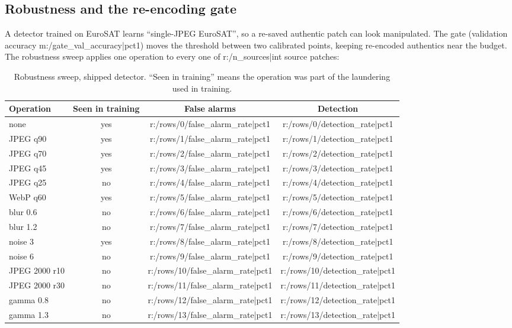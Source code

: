 \subsection{Robustness and the re-encoding gate}\label{sec:robust}
A detector trained on EuroSAT learns ``single-JPEG EuroSAT'', so a re-saved authentic patch can look manipulated. The gate (validation accuracy {{m:/gate_val_accuracy|pct1}}) moves the threshold between two calibrated points, keeping re-encoded authentics near the budget. The robustness sweep applies one operation to every one of {{r:/n_sources|int}} source patches:

\begin{table}[!htbp]
\centering\small
\begin{tabular}{|l|c|c|c|}
\hline
\textbf{Operation} & \textbf{Seen in training} & \textbf{False alarms} & \textbf{Detection}\\
\hline
none & yes & {{r:/rows/0/false_alarm_rate|pct1}} & {{r:/rows/0/detection_rate|pct1}}\\
\hline
JPEG q90 & yes & {{r:/rows/1/false_alarm_rate|pct1}} & {{r:/rows/1/detection_rate|pct1}}\\
\hline
JPEG q70 & yes & {{r:/rows/2/false_alarm_rate|pct1}} & {{r:/rows/2/detection_rate|pct1}}\\
\hline
JPEG q45 & yes & {{r:/rows/3/false_alarm_rate|pct1}} & {{r:/rows/3/detection_rate|pct1}}\\
\hline
JPEG q25 & no & {{r:/rows/4/false_alarm_rate|pct1}} & {{r:/rows/4/detection_rate|pct1}}\\
\hline
WebP q60 & yes & {{r:/rows/5/false_alarm_rate|pct1}} & {{r:/rows/5/detection_rate|pct1}}\\
\hline
blur 0.6 & no & {{r:/rows/6/false_alarm_rate|pct1}} & {{r:/rows/6/detection_rate|pct1}}\\
\hline
blur 1.2 & no & {{r:/rows/7/false_alarm_rate|pct1}} & {{r:/rows/7/detection_rate|pct1}}\\
\hline
noise 3 & yes & {{r:/rows/8/false_alarm_rate|pct1}} & {{r:/rows/8/detection_rate|pct1}}\\
\hline
noise 6 & no & {{r:/rows/9/false_alarm_rate|pct1}} & {{r:/rows/9/detection_rate|pct1}}\\
\hline
JPEG 2000 r10 & no & {{r:/rows/10/false_alarm_rate|pct1}} & {{r:/rows/10/detection_rate|pct1}}\\
\hline
JPEG 2000 r30 & no & {{r:/rows/11/false_alarm_rate|pct1}} & {{r:/rows/11/detection_rate|pct1}}\\
\hline
gamma 0.8 & no & {{r:/rows/12/false_alarm_rate|pct1}} & {{r:/rows/12/detection_rate|pct1}}\\
\hline
gamma 1.3 & no & {{r:/rows/13/false_alarm_rate|pct1}} & {{r:/rows/13/detection_rate|pct1}}\\
\hline
\end{tabular}
\caption{Robustness sweep, shipped detector. ``Seen in training'' means the operation was part of the laundering used in training.}
\end{table}

